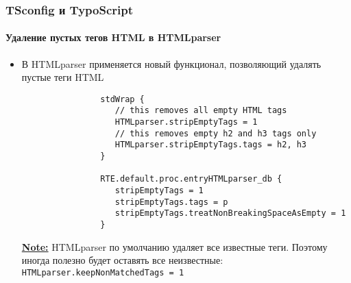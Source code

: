 \begin{frame}[fragile]
	\frametitle{TSconfig и TypoScript}
	\framesubtitle{Удаление пустых тегов HTML в HTMLparser}

	\lstset{basicstyle=\tiny\ttfamily}

	\begin{itemize}
		\item В HTMLparser применяется новый функционал, позволяющий удалять пустые
		  теги HTML

			\begin{lstlisting}
				stdWrap {
				   // this removes all empty HTML tags
				   HTMLparser.stripEmptyTags = 1
				   // this removes empty h2 and h3 tags only
				   HTMLparser.stripEmptyTags.tags = h2, h3
				}

				RTE.default.proc.entryHTMLparser_db {
				   stripEmptyTags = 1
				   stripEmptyTags.tags = p
				   stripEmptyTags.treatNonBreakingSpaceAsEmpty = 1
				}
			\end{lstlisting}

			\underline{\textbf{Note:}}
				HTMLparser по умолчанию удаляет все известные теги.\newline
				Поэтому иногда полезно будет оставять все неизвестные:\newline
				\texttt{HTMLparser.keepNonMatchedTags = 1}

	\end{itemize}

\end{frame}

